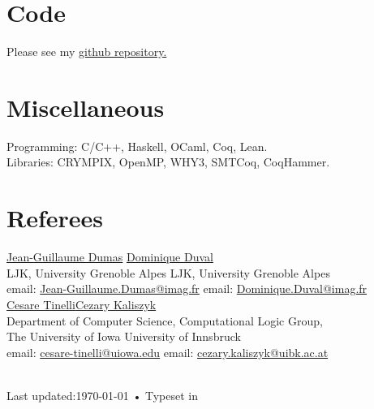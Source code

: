 \documentclass[12pt, a4paper]{article}
\begin{document}
\section*{Code}
Please see my \href{https://github.com/ekiciburak}{github repository.}
\section*{Miscellaneous}
Programming: C/C++, Haskell, OCaml, Coq, Lean. \\
Libraries: CRYMPIX, OpenMP, WHY3, SMTCoq, CoqHammer.
\section*{Referees}
\href{http://ljk.imag.fr/membres/Jean-Guillaume.Dumas/}{Jean-Guillaume Dumas} \hfill \href{http://ljk.imag.fr/membres/Dominique.Duval/}{Dominique Duval}\\
LJK, University Grenoble Alpes \hfill LJK, University Grenoble Alpes\\
email: \href{mailto:Jean-Guillaume.Dumas@imag.fr}{Jean-Guillaume.Dumas@imag.fr} \hfill email: \href{mailto:Dominique.Duval@imag.fr}{Dominique.Duval@imag.fr}\\
\newpage
\href{http://homepage.cs.uiowa.edu/~tinelli/index.html}{Cesare Tinelli}\hfill \href{http://cl-informatik.uibk.ac.at/users/cek/}{Cezary Kaliszyk}\\
Department of Computer Science, \hfill Computational Logic Group,\\
The University of Iowa \hfill University of Innsbruck\\
email: \href{mailto:cesare-tinelli@uiowa.edu}{cesare-tinelli@uiowa.edu} \hfill email: \href{cezary.kaliszyk@uibk.ac.at}{cezary.kaliszyk@uibk.ac.at}\\\\


\begin{center}
{\scriptsize  Last updated:\today\- •\- 
Typeset in \href{http://en.wikipedia.org/wiki/XeTeX}{
\XeTeX}}
\end{center}
\end{document}
